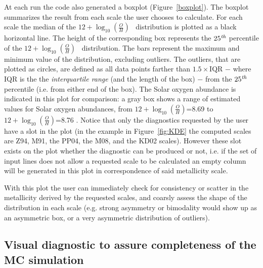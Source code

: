 \documentclass{emulateapj}
\newcommand{\oxab}{\ensuremath{12 + \log_{10}(\frac{O}{H})}}
\begin{document}
At each run the code also generated a boxplot (Figure~\ref{boxplot}). The boxplot summarizes the result from each scale the user chooses to calculate. For each scale the median of the \oxab~ distribution is plotted as a black horizontal line. The height of the corresponding box represents the $25^\mathrm{\emph{th}}$ percentile of the \oxab~ distribution. 
The bars represent the maximum and minimum value of the distribution, excluding outliers. The outliers, that are plotted as circles, are defined as all data points farther than  $1.5\times\mathrm{IQR}$ $-$ where IQR is the the \emph{interquartile range} (and the length of the box) $-$ from the $25^\mathrm{\emph{th}}$ percentile (i.e. from either end of the box). 
The Solar oxygen abundance is indicated in this plot for comparison: a gray box shows a range of estimated values for Solar oxygen abundances, from \oxab=8.69 \citep{asplund09_rev} to \oxab=8.76 \citep{chaffau11}.
Notice that only the diagnostics requested by the user have a slot in the plot (in the example in Figure~\ref{fig:KDE} the computed scales are Z94, M91, the PP04, the M08, and the KD02 scales). However these slot exists on the plot whether the diagnostic can be produced or not, i.e. if the set of input lines does not allow a requested scale to be calculated an empty column will be generated in this plot in correspondence of said metallicity scale. 

With this plot the user can immediately check for consistency or scatter in the metallicity derived by the requested scales, and  coarsly assess the shape of the distribution in each scale (e.g. strong asymmetry or bimodality would show up as an asymmetric box, or a very asymmetric distribution of outliers).



\subsection{Visual diagnostic to assure completeness of the MC simulation}\label{sec:completeness}
\end{document}
